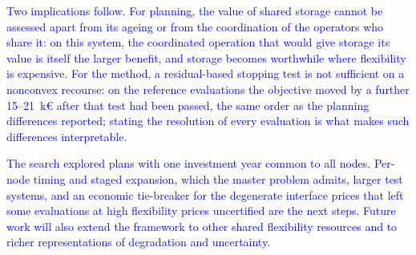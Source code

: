 \textcolor{blue}{
    Two implications follow. For planning, the value of shared storage cannot be assessed apart from its ageing or from the coordination of the operators who share it: on this system, the coordinated operation that would give storage its value is itself the larger benefit, and storage becomes worthwhile where flexibility is expensive. For the method, a residual-based stopping test is not sufficient on a nonconvex recourse: on the reference evaluations the objective moved by a further 15--21~k\euro{} after that test had been passed, the same order as the planning differences reported; stating the resolution of every evaluation is what makes such differences interpretable.
}

\textcolor{blue}{
    The search explored plans with one investment year common to all nodes. Per-node timing and staged expansion, which the master problem admits, larger test systems, and an economic tie-breaker for the degenerate interface prices that left some evaluations at high flexibility prices uncertified are the next steps. Future work will also extend the framework to other shared flexibility resources and to richer representations of degradation and uncertainty.
}
